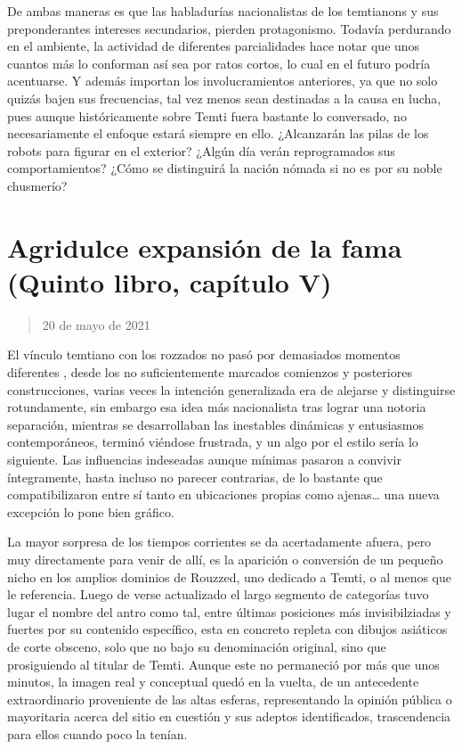 \documentclass[
]{book}
\begin{document}
De ambas maneras es que las habladurías nacionalistas de los temtianons y sus preponderantes intereses secundarios, pierden protagonismo. Todavía perdurando en el ambiente, la actividad de diferentes parcialidades hace notar que unos cuantos más lo conforman así sea por ratos cortos, lo cual en el futuro podría acentuarse. Y además importan los involucramientos anteriores, ya que no solo quizás bajen sus frecuencias, tal vez menos sean destinadas a la causa en lucha, pues aunque históricamente sobre Temti fuera bastante lo conversado, no necesariamente el enfoque estará siempre en ello. ¿Alcanzarán las pilas de los robots para figurar en el exterior? ¿Algún día verán reprogramados sus comportamientos? ¿Cómo se distinguirá la nación nómada si no es por su noble chusmerío?

\hypertarget{agridulce-expansiuxf3n-de-la-fama-quinto-libro-capuxedtulo-v}{%
\section{Agridulce expansión de la fama (Quinto libro, capítulo V)}\label{agridulce-expansiuxf3n-de-la-fama-quinto-libro-capuxedtulo-v}}

\begin{quote}
20 de mayo de 2021
\end{quote}

El vínculo temtiano con los rozzados no pasó por demasiados momentos diferentes , desde los no suficientemente marcados comienzos y posteriores construcciones, varias veces la intención generalizada era de alejarse y distinguirse rotundamente, sin embargo esa idea más nacionalista tras lograr una notoria separación, mientras se desarrollaban las inestables dinámicas y entusiasmos contemporáneos, terminó viéndose frustrada, y un algo por el estilo sería lo siguiente. Las influencias indeseadas aunque mínimas pasaron a convivir íntegramente, hasta incluso no parecer contrarias, de lo bastante que compatibilizaron entre sí tanto en ubicaciones propias como ajenas\ldots{} una nueva excepción lo pone bien gráfico.

La mayor sorpresa de los tiempos corrientes se da acertadamente afuera, pero muy directamente para venir de allí, es la aparición o conversión de un pequeño nicho en los amplios dominios de Rouzzed, uno dedicado a Temti, o al menos que le referencia. Luego de verse actualizado el largo segmento de categorías tuvo lugar el nombre del antro como tal, entre últimas posiciones más invisibilziadas y fuertes por su contenido específico, esta en concreto repleta con dibujos asiáticos de corte obsceno, solo que no bajo su denominación original, sino que prosiguiendo al titular de Temti. Aunque este no permaneció por más que unos minutos, la imagen real y conceptual quedó en la vuelta, de un antecedente extraordinario proveniente de las altas esferas, representando la opinión pública o mayoritaria acerca del sitio en cuestión y sus adeptos identificados, trascendencia para ellos cuando poco la tenían.
\end{document}
